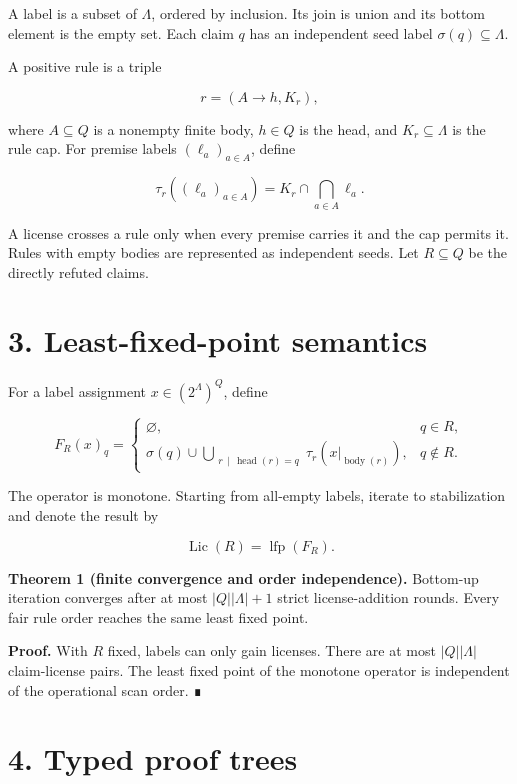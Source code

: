 \documentclass[
  11pt,
]{article}
\begin{document}
A label is a subset of \(\Lambda\), ordered by inclusion. Its join is
union and its bottom element is the empty set. Each claim \(q\) has an
independent seed label \(\sigma(q)\subseteq\Lambda\).

A positive rule is a triple

\[
r=(A\to h, K_r),
\]

where \(A\subseteq Q\) is a nonempty finite body, \(h\in Q\) is the
head, and \(K_r\subseteq\Lambda\) is the rule cap. For premise labels
\((\ell_a)_{a\in A}\), define

\[
\tau_r((\ell_a)_{a\in A})
=K_r\cap\bigcap_{a\in A}\ell_a.
\]

A license crosses a rule only when every premise carries it and the cap
permits it. Rules with empty bodies are represented as independent
seeds. Let \(R\subseteq Q\) be the directly refuted claims.

\hypertarget{least-fixed-point-semantics}{%
\section{3. Least-fixed-point
semantics}\label{least-fixed-point-semantics}}

For a label assignment \(x\in(2^\Lambda)^Q\), define

\[
F_R(x)_q=
\begin{cases}
\varnothing,&q\in R, \\
\displaystyle\sigma(q)\cup
\bigcup_{\substack{r\,\mid\,\operatorname{head}(r)=q}}
\tau_r(x|_{\operatorname{body}(r)}),&q\notin R.
\end{cases}
\]

The operator is monotone. Starting from all-empty labels, iterate to
stabilization and denote the result by

\[
\operatorname{Lic}(R)=\operatorname{lfp}(F_R).
\]

\textbf{Theorem 1 (finite convergence and order independence).}
Bottom-up iteration converges after at most \(|Q||\Lambda|+1\) strict
license-addition rounds. Every fair rule order reaches the same least
fixed point.

\textbf{Proof.} With \(R\) fixed, labels can only gain licenses. There
are at most \(|Q||\Lambda|\) claim-license pairs. The least fixed point
of the monotone operator is independent of the operational scan order. ∎

\hypertarget{typed-proof-trees}{%
\section{4. Typed proof trees}\label{typed-proof-trees}}
\end{document}
